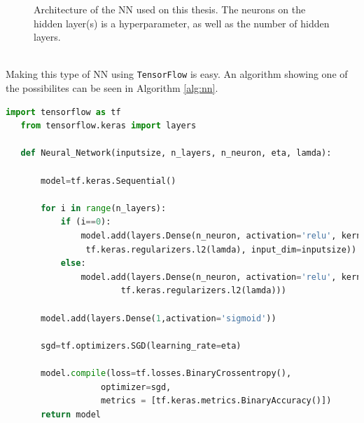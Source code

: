 \documentclass[14pt, a4paper]{book}
\begin{document}
\begin{figure}[!ht]
   \caption[Neural Network Architecture]{Architecture of the NN used on this thesis. 
   The neurons on the hidden layer(s) is a hyperparameter, as well as the number of hidden layers. }\label{fig:NNArch}
\end{figure}
\\Making this type of NN using \verb|TensorFlow| is easy. An algorithm showing one of the possibilites can be seen in Algorithm \ref{alg:nn}.
\begin{lstlisting}[language=Python, caption={Neural network definition using TensorFlow}, label=alg:nn, captionpos=t]
   import tensorflow as tf
   from tensorflow.keras import layers
   
   def Neural_Network(inputsize, n_layers, n_neuron, eta, lamda):
       
       model=tf.keras.Sequential()      
       
       for i in range(n_layers):       
           if (i==0):                  
               model.add(layers.Dense(n_neuron, activation='relu', kernel_regularizer=
                tf.keras.regularizers.l2(lamda), input_dim=inputsize))
           else:                       
               model.add(layers.Dense(n_neuron, activation='relu', kernel_regularizer=
                       tf.keras.regularizers.l2(lamda)))
                       
       model.add(layers.Dense(1,activation='sigmoid')) 
       
       sgd=tf.optimizers.SGD(learning_rate=eta)
       
       model.compile(loss=tf.losses.BinaryCrossentropy(),
                   optimizer=sgd,
                   metrics = [tf.keras.metrics.BinaryAccuracy()])
       return model
   \end{lstlisting}
\end{document}

